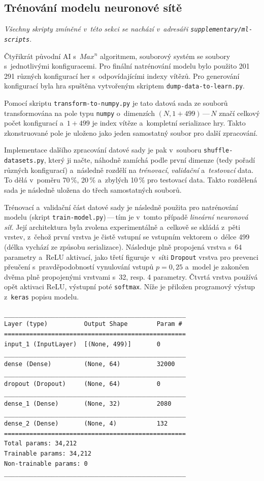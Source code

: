 \documentclass[11pt, a4paper]{article}
\theoremstyle{definition}
\begin{document}
\subsection{Trénování modelu neuronové sítě}
\label{sec:trainModel}

\textit{Všechny skripty zmíněné v~této sekci se nachází v~adresáři \texttt{supplementary/ml-scripts}}.

Čtyřikrát původní AI s~$ Max^n $ algoritmem, souborový systém se soubory s~jednotlivými konfiguracemi. Pro finální natrénování modelu bylo použito 201\,291 různých konfigurací her s~odpovídajícími indexy vítězů. Pro generování konfigurací byla hra spuštěna vytvořeným skriptem \texttt{dump-data-to-learn.py}.

Pomocí skriptu \texttt{transform-to-numpy.py} je tato datová sada ze souborů transformována na pole typu \texttt{numpy} o~dimenzích $(N, 1 + 499)$\,---\,$N$ značí celkový počet konfigurací a~$1 + 499$ je index vítěze a~kompletní serializace hry. Takto zkonstruované pole je uloženo jako jeden samostatný soubor pro další zpracování.

Implementace dalšího zpracování datové sady je pak v~souboru \texttt{shuffle-datasets.py}, který ji načte, náhodně zamíchá podle první dimenze (tedy pořadí různých konfigurací) a~následně rozdělí na \emph{trénovací}, \emph{validační} a~\emph{testovací} data. To dělá v~poměru 70\,\%, 20\,\% a~zbylých 10\,\% pro testovací data. Takto rozdělená sada je následně uložena do třech samostatných souborů.

Trénovací a~validační část datové sady je následně použita pro natrénování modelu (skript \texttt{train-model.py})\,---\,tím je v~tomto případě \emph{lineární neuronová síť}. Její architektura byla zvolena experimentálně a~celkově se skládá z~pěti vrstev,
z~čehož první vrstva je čistě vstupní se vstupním vektorem o~délce 499 (délka vychází ze způsobu serializace). Následuje plně propojená vrstva s~64 parametry a~ReLU aktivací, jako třetí figuruje v~síti \texttt{Dropout} vrstva pro prevenci přeučení s~pravděpodobností vynulování vstupů $ p = 0,25 $ a~model je zakončen dvěma plně propojenými vrstvami s~32, resp. 4 parametry. Čtvrtá vrstva používá opět aktivaci ReLU, výstupní poté \texttt{softmax}. Níže je přiložen programový výstup z~\texttt{keras} popisu modelu.

\begin{verbatim}
__________________________________________________
Layer (type)          Output Shape        Param #
==================================================
input_1 (InputLayer)  [(None, 499)]       0
__________________________________________________
dense (Dense)         (None, 64)          32000
__________________________________________________
dropout (Dropout)     (None, 64)          0
__________________________________________________
dense_1 (Dense)       (None, 32)          2080
__________________________________________________
dense_2 (Dense)       (None, 4)           132
==================================================
Total params: 34,212
Trainable params: 34,212
Non-trainable params: 0
__________________________________________________
\end{verbatim}
\end{document}
